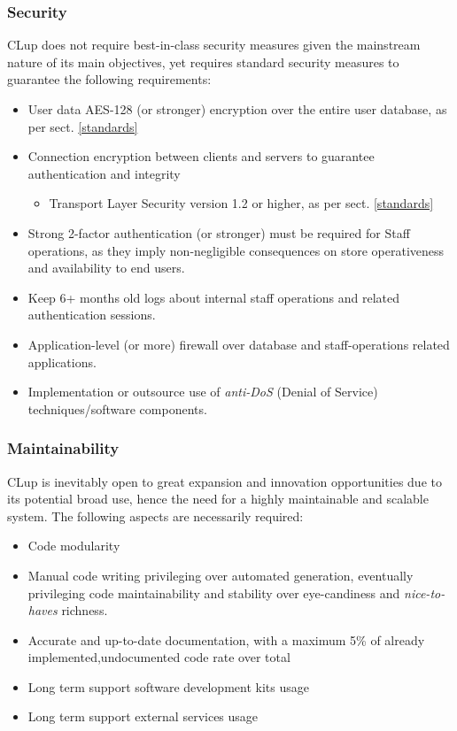 \subsubsection{Security}
CLup does not require best-in-class security measures given the mainstream nature of its main objectives, yet requires standard security measures to guarantee the following requirements:\newline
\begin{itemize}
    \item User data AES-128 (or stronger) encryption over the entire user database, as per sect. \ref{standards}
    \item Connection encryption between clients and servers to guarantee authentication and integrity 
    \begin{itemize}
        \item Transport Layer Security version 1.2 or higher, as per sect. \ref{standards}
    \end{itemize}
    \item Strong 2-factor authentication (or stronger) must be required for Staff operations, as they imply non-negligible consequences on store operativeness and availability to end users.
    \item Keep 6+ months old logs about internal staff operations and related authentication sessions.
    \item Application-level (or more) firewall over database and staff-operations related applications.
    \item Implementation or outsource use of \textit{anti-DoS} (Denial of Service) techniques/software components.
\end{itemize}

\subsubsection{Maintainability}
CLup is inevitably open to great expansion and innovation opportunities due to its potential broad use, hence the need for a highly maintainable and scalable system.
The following aspects are necessarily required:\newline
\begin{itemize}
    \item Code modularity
    \item Manual code writing privileging over automated generation, eventually privileging code maintainability and stability over eye-candiness and \textit{nice-to-haves} richness.
    \item Accurate and up-to-date documentation, with a maximum 5\% of already implemented,undocumented code rate over total
    \item Long term support software development kits usage
    \item Long term support external services usage
\end{itemize}


